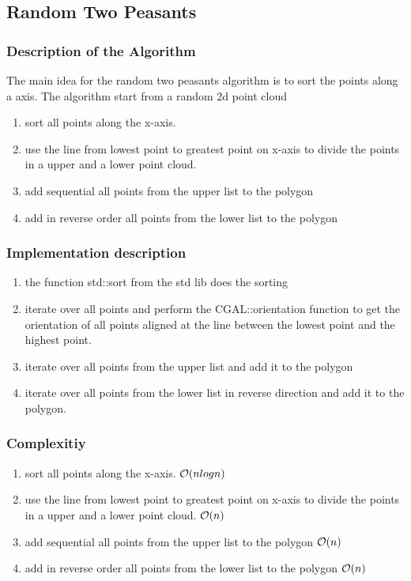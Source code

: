 \subsection{Random Two Peasants}
\subsubsection{Description of the Algorithm}
The main idea for the random two peasants algorithm is to sort the points along
a axis. The algorithm start from a random 2d point cloud 

\begin{enumerate}
  \item sort all points along the x-axis.
  \item use the line  from lowest point to greatest point
    on x-axis to divide the points in a upper  and a lower
     point cloud.
  \item add sequential all points from the upper list to the polygon
  \item add in reverse order all points from the lower list to the
    polygon 
\end{enumerate}

\subsubsection{Implementation description}

\begin{enumerate}
  \item the function std::sort from the std lib does the sorting
  \item iterate over all points and perform the CGAL::orientation function to
    get the orientation of all points aligned at the line between the lowest
    point and the highest point.
  \item iterate over all points from the upper list and add it to the polygon
  \item iterate over all points from the lower list in reverse direction and add
    it to the polygon.
\end{enumerate}

\subsubsection{Complexitiy}

\begin{enumerate}
  \item sort all points along the x-axis. $\mathcal{O}(nlogn)$
  \item use the line from lowest point to greatest point on x-axis to divide the
    points in a upper and a lower point cloud. $\mathcal{O}(n)$
  \item add sequential all points from the upper list to the polygon $\mathcal{O}(n)$
  \item add in reverse order all points from the lower list to the polygon $\mathcal{O}(n)$
\end{enumerate}

